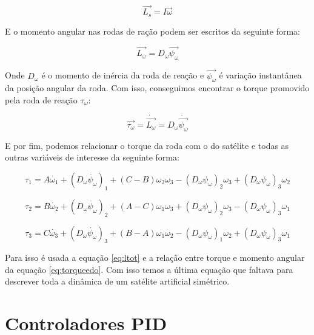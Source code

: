 \begin{equation}
\vec{L_s}=I\vec{\omega}
\end{equation}

E o momento angular nas rodas de ração podem ser escritos da seguinte forma:

\begin{equation}
\vec {L_{\omega} } =D_{\omega}\vec{\psi_{\omega}} 
\end{equation}

Onde $D_{\omega}$ é o momento de inércia da roda de reação e $\vec{\psi_{\omega}}$ é variação instantânea da posição angular da roda. Com isso, conseguimos encontrar o torque promovido pela roda de reação $\tau_{\omega}$:

\begin{equation}\label{eq:torqueedo}
\vec{\tau_{\omega}}=\dot{\vec{L_{\omega}}}=D_{\omega}\dot{\vec{\psi_{\omega}}}
\end{equation}

E por fim, podemos relacionar o torque da roda com o do satélite e todas as outras variáveis de interesse da seguinte forma:

\begin{equation}\label{eq:torquefinal1}
\tau_{1}=A\dot{\omega_{1}}+(D_{\omega}\dot{\psi_{\omega}})_{1}+(C-B)\omega_{2}\omega_{3}-(D_{\omega}\psi_{\omega})_{2}\omega_{3}+(D_{\omega}\psi_{\omega})_{3}\omega_{2}
\end{equation}

\begin{equation}\label{eq:torquefinal2}
\tau_{2}=B\dot{\omega_{2}}+(D_{\omega}\dot{\psi_{\omega}})_{2}+(A-C)\omega_{1}\omega_{3}+(D_{\omega}\psi_{\omega})_{2}\omega_{3}-(D_{\omega}\psi_{\omega})_{3}\omega_{1}
\end{equation}

\begin{equation}\label{eq:torquefinal3}
\tau_{3}=C\dot{\omega_{3}}+(D_{\omega}\dot{\psi_{\omega}})_{3}+(B-A)\omega_{1}\omega_{2}-(D_{\omega}\psi_{\omega})_{1}\omega_{2}+(D_{\omega}\psi_{\omega})_{3}\omega_{1}
\end{equation}

Para isso é usada a equação \ref{eq:ltot} e a relação entre torque e momento angular da equação \ref{eq:torqueedo}. Com isso temos a última equação que faltava para descrever toda a dinâmica de um satélite artificial simétrico. 


\section{Controladores PID}

